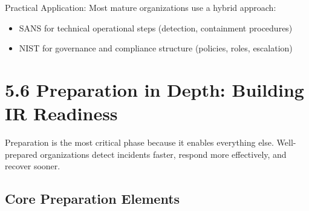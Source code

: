\documentclass[10pt]{article}
\begin{document}
Practical Application: Most mature organizations use a hybrid approach:

\begin{itemize}
  \item SANS for technical operational steps (detection, containment procedures)
  \item NIST for governance and compliance structure (policies, roles, escalation)
\end{itemize}

\section*{5.6 Preparation in Depth: Building IR Readiness}
Preparation is the most critical phase because it enables everything else. Well-prepared organizations detect incidents faster, respond more effectively, and recover sooner.

\subsection*{Core Preparation Elements}
\end{document}
